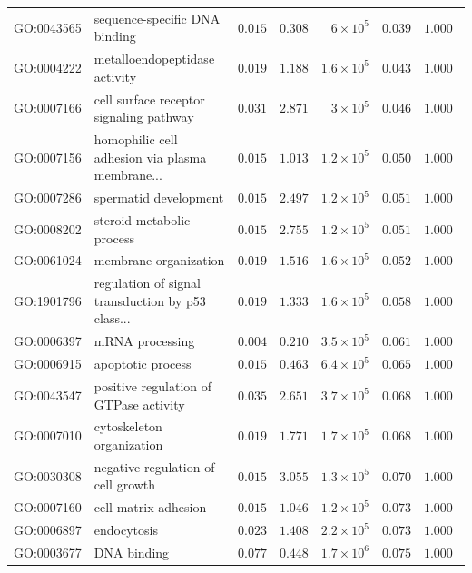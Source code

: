 \documentclass{article}
\begin{document}
\begin{center}
\begin{longtable*}{|l|l|r|r|r|r|r|}
            GO:0043565 & sequence-specific DNA binding & $ 0.015$ & $ 0.308$ & $ 6\times 10^{5}$ & $ 0.039$ & $ 1.000~~$ \\
            GO:0004222 & metalloendopeptidase activity & $ 0.019$ & $ 1.188$ & $1.6\times 10^{5}$ & $ 0.043$ & $ 1.000~~$ \\
            GO:0007166 & cell surface receptor signaling pathway & $ 0.031$ & $ 2.871$ & $ 3\times 10^{5}$ & $ 0.046$ & $ 1.000~~$ \\
            GO:0007156 & homophilic cell adhesion via plasma membrane... & $ 0.015$ & $ 1.013$ & $1.2\times 10^{5}$ & $ 0.050$ & $ 1.000~~$ \\
            GO:0007286 & spermatid development & $ 0.015$ & $ 2.497$ & $1.2\times 10^{5}$ & $ 0.051$ & $ 1.000~~$ \\
            GO:0008202 & steroid metabolic process & $ 0.015$ & $ 2.755$ & $1.2\times 10^{5}$ & $ 0.051$ & $ 1.000~~$ \\
            GO:0061024 & membrane organization & $ 0.019$ & $ 1.516$ & $1.6\times 10^{5}$ & $ 0.052$ & $ 1.000~~$ \\
            GO:1901796 & regulation of signal transduction by p53 class... & $ 0.019$ & $ 1.333$ & $1.6\times 10^{5}$ & $ 0.058$ & $ 1.000~~$ \\
            GO:0006397 & mRNA processing & $ 0.004$ & $ 0.210$ & $3.5\times 10^{5}$ & $ 0.061$ & $ 1.000~~$ \\
            GO:0006915 & apoptotic process & $ 0.015$ & $ 0.463$ & $6.4\times 10^{5}$ & $ 0.065$ & $ 1.000~~$ \\
            GO:0043547 & positive regulation of GTPase activity & $ 0.035$ & $ 2.651$ & $3.7\times 10^{5}$ & $ 0.068$ & $ 1.000~~$ \\
            GO:0007010 & cytoskeleton organization & $ 0.019$ & $ 1.771$ & $1.7\times 10^{5}$ & $ 0.068$ & $ 1.000~~$ \\
            GO:0030308 & negative regulation of cell growth & $ 0.015$ & $ 3.055$ & $1.3\times 10^{5}$ & $ 0.070$ & $ 1.000~~$ \\
            GO:0007160 & cell-matrix adhesion & $ 0.015$ & $ 1.046$ & $1.2\times 10^{5}$ & $ 0.073$ & $ 1.000~~$ \\
            GO:0006897 & endocytosis & $ 0.023$ & $ 1.408$ & $2.2\times 10^{5}$ & $ 0.073$ & $ 1.000~~$ \\
            GO:0003677 & DNA binding & $ 0.077$ & $ 0.448$ & $1.7\times 10^{6}$ & $ 0.075$ & $ 1.000~~$ \\

\end{longtable*}
\end{center}
\end{document}
